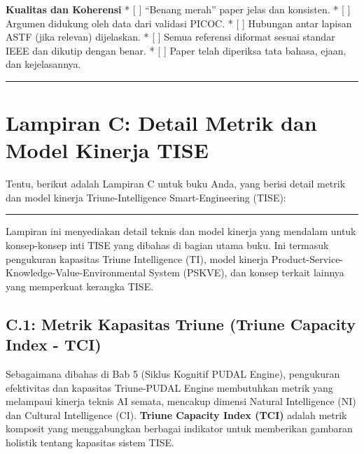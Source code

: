 \documentclass[
  letterpaper,
  DIV=11,
  numbers=noendperiod]{scrreprt}
\begin{document}
\textbf{Kualitas dan Koherensi} * {[} {]} ``Benang merah'' paper jelas
dan konsisten. * {[} {]} Argumen didukung oleh data dari validasi PICOC.
* {[} {]} Hubungan antar lapisan ASTF (jika relevan) dijelaskan. * {[}
{]} Semua referensi diformat sesuai standar IEEE dan dikutip dengan
benar. * {[} {]} Paper telah diperiksa tata bahasa, ejaan, dan
kejelasannya.

\begin{center}\rule{0.5\linewidth}{0.5pt}\end{center}


\chapter{\texorpdfstring{\textbf{Lampiran C: Detail Metrik dan Model
Kinerja
TISE}}{Lampiran C: Detail Metrik dan Model Kinerja TISE}}\label{lampiran-c-detail-metrik-dan-model-kinerja-tise}

Tentu, berikut adalah Lampiran C untuk buku Anda, yang berisi detail
metrik dan model kinerja Triune-Intelligence Smart-Engineering (TISE):

\begin{center}\rule{0.5\linewidth}{0.5pt}\end{center}

Lampiran ini menyediakan detail teknis dan model kinerja yang mendalam
untuk konsep-konsep inti TISE yang dibahas di bagian utama buku. Ini
termasuk pengukuran kapasitas Triune Intelligence (TI), model kinerja
Product-Service-Knowledge-Value-Environmental System (PSKVE), dan konsep
terkait lainnya yang memperkuat kerangka TISE.

\section{\texorpdfstring{\textbf{C.1: Metrik Kapasitas Triune (Triune
Capacity Index -
TCI)}}{C.1: Metrik Kapasitas Triune (Triune Capacity Index - TCI)}}\label{c.1-metrik-kapasitas-triune-triune-capacity-index---tci}

Sebagaimana dibahas di Bab 5 (Siklus Kognitif PUDAL Engine), pengukuran
efektivitas dan kapasitas Triune-PUDAL Engine membutuhkan metrik yang
melampaui kinerja teknis AI semata, mencakup dimensi Natural
Intelligence (NI) dan Cultural Intelligence (CI). \textbf{Triune
Capacity Index (TCI)} adalah metrik komposit yang menggabungkan berbagai
indikator untuk memberikan gambaran holistik tentang kapasitas sistem
TISE.
\end{document}

